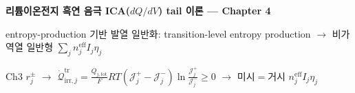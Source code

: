 \documentclass[11pt,a4paper]{article}
\newcommand{\eff}{\mathrm{eff}}
\newcommand{\tot}{\mathrm{tot}}
\newcommand{\irr}{\mathrm{irr}}
\newcommand{\tr}{\mathrm{tr}}
\begin{document}
\sloppy
\begin{center}
{\LARGE\bfseries 리튬이온전지 흑연 음극 ICA($dQ/dV$) tail 이론 — Chapter 4\par}
\vspace{0.4em}
{\large entropy-production 기반 발열 일반화: transition-level entropy production $\to$
비가역열 일반형 $\sum_j n_j^{\eff}I_j\eta_j$\par}
\vspace{0.2em}
{\normalsize Ch3 $r_j^\pm$ $\to$ $\dot{\mathcal Q}_{\irr,j}^{\tr}{=}\tfrac{Q_{j,\tot}}{F}RT(\mathcal J_j^+{-}\mathcal J_j^-)\ln\tfrac{\mathcal J_j^+}{\mathcal J_j^-}\ge0$ $\to$ 미시$=$거시 $n_j^{\eff}I_j\eta_j$\par}
\end{center}

\end{document}
